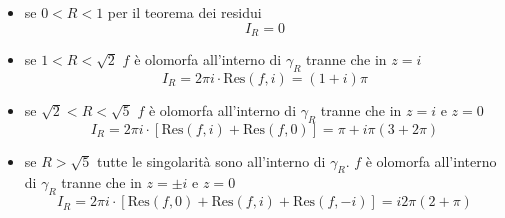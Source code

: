 \begin{itemize}
\item se $0< R< 1$ per il teorema dei residui\begin{equation*}
I_{R} =0
\end{equation*}
\item se $1< R< \sqrt{2}$ $f$ è olomorfa all'interno di $\gamma _{R}$ tranne che in $z=i$\begin{equation*}
I_{R} =2\pi i\cdotp \mathrm{Res}\left( f,i\right) =\left( 1+i\right) \pi 
\end{equation*}
\item se $\sqrt{2} < R< \sqrt{5}$ $f$ è olomorfa all'interno di $\gamma _{R}$ tranne che in $z=i$ e $z=0$\begin{equation*}
I_{R} =2\pi i\cdotp \left[\mathrm{Res}\left( f,i\right) +\mathrm{Res}\left( f,0\right)\right] =\pi +i\pi \left( 3 +2\pi\right)
\end{equation*}
\item se $R> \sqrt{5}$ tutte le singolarità sono all'interno di $\gamma _{R}$. $f$ è olomorfa all'interno di $\gamma _{R}$ tranne che in $z=\pm i$ e $z=0$\begin{equation*}
I_{R} =2\pi i\cdotp \left[\mathrm{Res}\left( f,0\right) +\mathrm{Res}\left( f,i\right) +\mathrm{Res}\left( f,-i\right)\right] = i2\pi (2+\pi )
\end{equation*}
\end{itemize}

